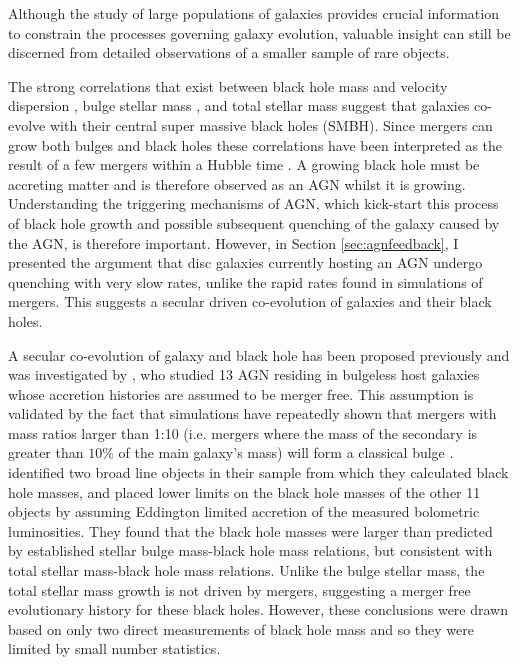 
Although the study of large populations of galaxies provides crucial information to constrain the processes governing galaxy evolution, valuable insight can still be discerned from detailed observations of a smaller sample of rare objects. 

The strong correlations that exist between black hole mass and velocity dispersion \citep{magorrian98, merritt01, hu08, kormendy11a, mcconnell11}, bulge stellar mass \citep{marconi03, haringrix04}, and total stellar mass \citep{cisternas11, Simmons13} suggest that galaxies co-evolve with their central super massive black holes (SMBH). Since mergers can grow both bulges and black holes these correlations have been interpreted as the result of a few mergers within a Hubble time \citep{peng07, hopkins08a, jahnke11}. A growing black hole must be accreting matter and is therefore observed as an AGN whilst it is growing. Understanding the triggering mechanisms of AGN, which kick-start this process of black hole growth and possible subsequent quenching of the galaxy caused by the AGN, is therefore important. However, in Section \ref{sec:agnfeedback}, I presented the argument that disc galaxies currently hosting an AGN undergo quenching with very slow rates, unlike the rapid rates found in simulations of mergers. This suggests a secular driven co-evolution of galaxies and their black holes. 

A secular co-evolution of galaxy and black hole has been proposed previously \citep{greene10b, jiang11b, cisternas11, Simmons11,schawinski11, kocevski12} and was investigated by \citet{Simmons13}, who studied 13 AGN residing in bulgeless host galaxies whose accretion histories are assumed to be merger free. This assumption is validated by the fact that simulations have repeatedly shown that mergers with mass ratios larger than 1:10 (i.e. mergers where the mass of the secondary is greater than $10\%$ of the main galaxy's mass) will form a classical bulge \citep{walker96, hopkins11c, tonini16}. \citeauthor{Simmons13} identified two broad line objects in their sample from which they calculated black hole masses, and placed lower limits on the black hole masses of the other 11 objects by assuming Eddington limited accretion of the measured bolometric luminosities. They found that the black hole masses were larger than predicted by established stellar bulge mass-black hole mass relations, but consistent with total stellar mass-black hole mass relations. Unlike the bulge stellar mass, the total stellar mass growth is not driven by mergers, suggesting a merger free evolutionary history for these black holes. However, these conclusions were drawn based on only two direct measurements of black hole mass and so they were limited by small number statistics.

